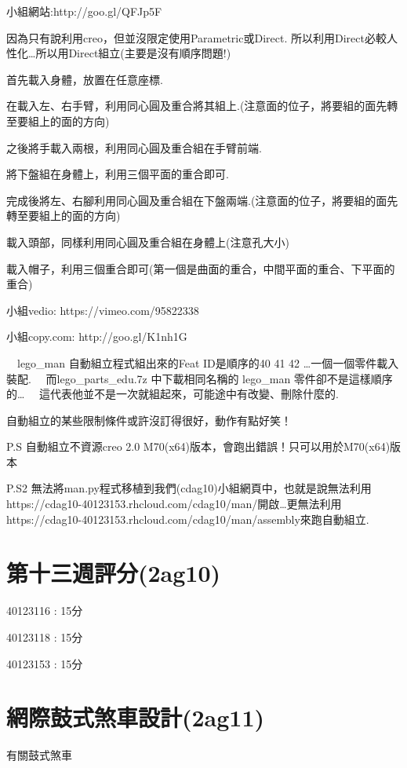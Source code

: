 \documentclass[]{article}
\begin{document}
小組網站:http://goo.gl/QFJp5F

因為只有說利用creo，但並沒限定使用Parametric或Direct.
所以利用Direct必較人性化\ldots{}所以用Direct組立(主要是沒有順序問題!)

首先載入身體，放置在任意座標.

在載入左、右手臂，利用同心圓及重合將其組上.(注意面的位子，將要組的面先轉至要組上的面的方向)

之後將手載入兩根，利用同心圓及重合組在手臂前端.

將下盤組在身體上，利用三個平面的重合即可.

完成後將左、右腳利用同心圓及重合組在下盤兩端.(注意面的位子，將要組的面先轉至要組上的面的方向)

載入頭部，同樣利用同心圓及重合組在身體上(注意孔大小)

載入帽子，利用三個重合即可(第一個是曲面的重合，中間平面的重合、下平面的重合)

小組vedio: https://vimeo.com/95822338

小組copy.com: http://goo.gl/K1nh1G

　lego\_man 自動組立程式組出來的Feat ID是順序的40 41 42
\ldots{}一個一個零件載入裝配. 　而lego\_parts\_edu.7z 中下載相同名稱的
lego\_man 零件卻不是這樣順序的\ldots{}
　這代表他並不是一次就組起來，可能途中有改變、刪除什麼的.

自動組立的某些限制條件或許沒訂得很好，動作有點好笑！

P.S 自動組立不資源creo 2.0
M70(x64)版本，會跑出錯誤！只可以用於M70(x64)版本

P.S2 無法將man.py程式移植到我們(cdag10)小組網頁中，也就是說無法利用
https://cdag10-40123153.rhcloud.com/cdag10/man/開啟\ldots{}更無法利用https://cdag10-40123153.rhcloud.com/cdag10/man/assembly來跑自動組立.

\section{第十三週評分(2ag10)}\label{ux7b2cux5341ux4e09ux9031ux8a55ux52062ag10}

40123116 : 15分

40123118 : 15分

40123153 : 15分

\section{網際鼓式煞車設計(2ag11)}\label{ux7db2ux969bux9f13ux5f0fux715eux8ecaux8a2dux8a082ag11}

有關鼓式煞車
\end{document}
